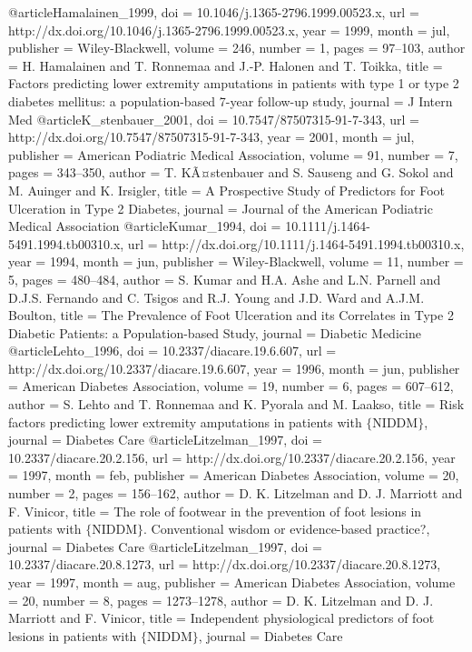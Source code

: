 @article{Hamalainen_1999,
	doi = {10.1046/j.1365-2796.1999.00523.x},
	url = {http://dx.doi.org/10.1046/j.1365-2796.1999.00523.x},
	year = 1999,
	month = {jul},
	publisher = {Wiley-Blackwell},
	volume = {246},
	number = {1},
	pages = {97--103},
	author = {H. Hamalainen and T. Ronnemaa and J.-P. Halonen and T. Toikka},
	title = {Factors predicting lower extremity amputations in patients with type 1 or type 2 diabetes mellitus: a population-based 7-year follow-up study},
	journal = {J Intern Med}
}
@article{K_stenbauer_2001,
	doi = {10.7547/87507315-91-7-343},
	url = {http://dx.doi.org/10.7547/87507315-91-7-343},
	year = 2001,
	month = {jul},
	publisher = {American Podiatric Medical Association},
	volume = {91},
	number = {7},
	pages = {343--350},
	author = {T. KÃ¤stenbauer and S. Sauseng and G. Sokol and M. Auinger and K. Irsigler},
	title = {A Prospective Study of Predictors for Foot Ulceration in Type 2 Diabetes},
	journal = {Journal of the American Podiatric Medical Association}
}
@article{Kumar_1994,
	doi = {10.1111/j.1464-5491.1994.tb00310.x},
	url = {http://dx.doi.org/10.1111/j.1464-5491.1994.tb00310.x},
	year = 1994,
	month = {jun},
	publisher = {Wiley-Blackwell},
	volume = {11},
	number = {5},
	pages = {480--484},
	author = {S. Kumar and H.A. Ashe and L.N. Parnell and D.J.S. Fernando and C. Tsigos and R.J. Young and J.D. Ward and A.J.M. Boulton},
	title = {The Prevalence of Foot Ulceration and its Correlates in Type 2 Diabetic Patients: a Population-based Study},
	journal = {Diabetic Medicine}
}
@article{Lehto_1996,
	doi = {10.2337/diacare.19.6.607},
	url = {http://dx.doi.org/10.2337/diacare.19.6.607},
	year = 1996,
	month = {jun},
	publisher = {American Diabetes Association},
	volume = {19},
	number = {6},
	pages = {607--612},
	author = {S. Lehto and T. Ronnemaa and K. Pyorala and M. Laakso},
	title = {Risk factors predicting lower extremity amputations in patients with $\lbrace$NIDDM$\rbrace$},
	journal = {Diabetes Care}
}
@article{Litzelman_1997,
	doi = {10.2337/diacare.20.2.156},
	url = {http://dx.doi.org/10.2337/diacare.20.2.156},
	year = 1997,
	month = {feb},
	publisher = {American Diabetes Association},
	volume = {20},
	number = {2},
	pages = {156--162},
	author = {D. K. Litzelman and D. J. Marriott and F. Vinicor},
	title = {The role of footwear in the prevention of foot lesions in patients with $\lbrace$NIDDM$\rbrace$. Conventional wisdom or evidence-based practice?},
	journal = {Diabetes Care}
}
@article{Litzelman_1997,
	doi = {10.2337/diacare.20.8.1273},
	url = {http://dx.doi.org/10.2337/diacare.20.8.1273},
	year = 1997,
	month = {aug},
	publisher = {American Diabetes Association},
	volume = {20},
	number = {8},
	pages = {1273--1278},
	author = {D. K. Litzelman and D. J. Marriott and F. Vinicor},
	title = {Independent physiological predictors of foot lesions in patients with $\lbrace$NIDDM$\rbrace$},
	journal = {Diabetes Care}
}
